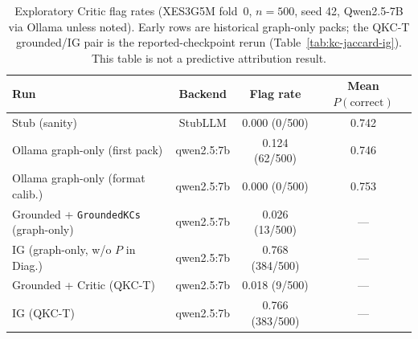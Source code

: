﻿%
\begin{table}[t]
\caption{Exploratory Critic flag rates (XES3G5M fold~0, $n{=}500$, seed 42,
Qwen2.5-7B via Ollama unless noted). Early rows are historical graph-only
packs; the QKC-T grounded/IG pair is the reported-checkpoint rerun
(Table~\ref{tab:kc-jaccard-ig}). This table is not a predictive
attribution result.}
\label{tab:tier2}
\centering
\scriptsize
\setlength{\tabcolsep}{3pt}
\begin{tabular}{@{}lccc@{}}
\toprule
Run & Backend & Flag rate & Mean $P(\mathrm{correct})$ \\
\midrule
Stub (sanity) & StubLLM & 0.000 (0/500) & 0.742 \\
Ollama graph-only (first pack) & qwen2.5:7b & 0.124 (62/500) & 0.746 \\
Ollama graph-only (format calib.) & qwen2.5:7b & 0.000 (0/500) & 0.753 \\
Grounded + \texttt{GroundedKCs} (graph-only) & qwen2.5:7b & 0.026 (13/500) & --- \\
IG (graph-only, w/o $P$ in Diag.) & qwen2.5:7b & 0.768 (384/500) & --- \\
Grounded + Critic (QKC-T) & qwen2.5:7b & 0.018 (9/500) & --- \\
IG (QKC-T) & qwen2.5:7b & 0.766 (383/500) & --- \\
\bottomrule
\end{tabular}
\end{table}
